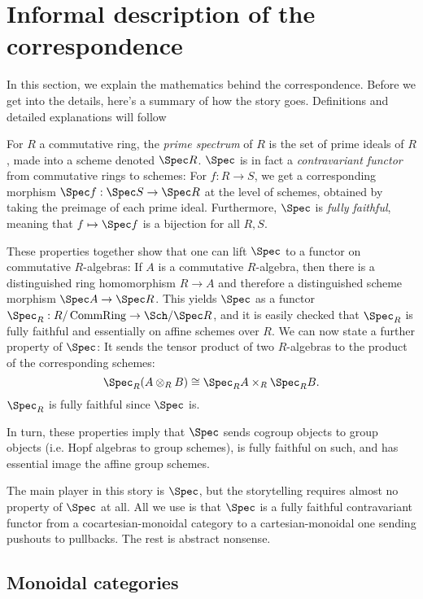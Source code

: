 \documentclass{article}
\DeclareMathOperator{\CommRing}{CommRing}
\begin{document}
\section{Informal description of the correspondence}\label{sec:informal}


In this section, we explain the mathematics behind the correspondence.
Before we get into the details, here's a summary of how the story goes.
Definitions and detailed explanations will follow

For $R$ a commutative ring, the \emph{prime spectrum} of $R$ is the set of prime ideals of $R$,
made into a scheme denoted $\Spec R$.
$\Spec$ is in fact a \emph{contravariant functor} from commutative rings to schemes:
For $f : R \to S$, we get a corresponding morphism $\Spec f : \Spec S \to \Spec R$
at the level of schemes, obtained by taking the preimage of each prime ideal.
Furthermore, $\Spec$ is \emph{fully faithful},
meaning that $f \mapsto \Spec f$ is a bijection for all $R, S$.

These properties together show that one can lift $\Spec$ to a functor on commutative $R$-algebras:
If $A$ is a commutative $R$-algebra, then there is a distinguished ring homomorphism $R \to A$
and therefore a distinguished scheme morphism $\Spec A \to \Spec R$.
This yields $\Spec$ as a functor $\Spec_R : R / \CommRing \to \Sch / \Spec R$,
and it is easily checked that $\Spec_R$ is fully faithful and essentially on affine schemes over $R$.
We can now state a further property of $\Spec$:
It sends the tensor product of two $R$-algebras to the product of the corresponding schemes:
\[
\Spec_R (A \otimes_R B) \cong \Spec_R A \times_R \Spec_R B.
\]
$\Spec_R$ is fully faithful since $\Spec$ is.

In turn, these properties imply that $\Spec$ sends cogroup objects to group objects
(i.e. Hopf algebras to group schemes), is fully faithful on such,
and has essential image the affine group schemes.

The main player in this story is $\Spec$,
but the storytelling requires almost no property of $\Spec$ at all.
All we use is that $\Spec$ is a fully faithful contravariant functor
from a cocartesian-monoidal category to a cartesian-monoidal one sending pushouts to pullbacks.
The rest is abstract nonsense.


\subsection{Monoidal categories}
\end{document}
